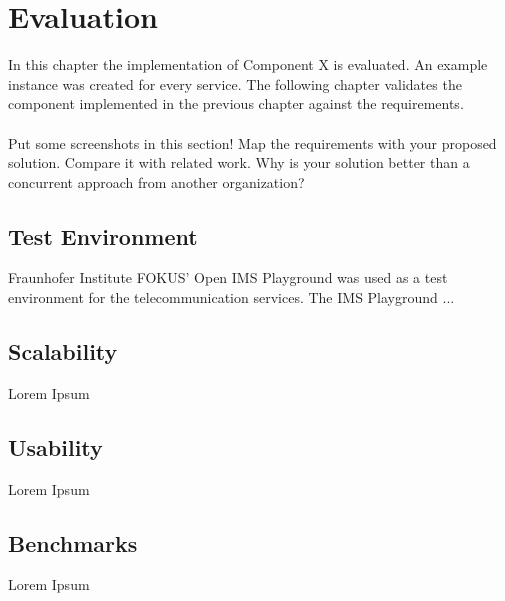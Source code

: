 \chapter{Evaluation\label{cha:chapter6}}

In this chapter the implementation of Component X is evaluated. An example instance was created for every service. The following chapter validates the component implemented in the previous chapter against the requirements.
\\
\\
Put some screenshots in this section! Map the requirements with your proposed solution. Compare it with related work. Why is your solution better than a concurrent approach from another organization?

\section{Test Environment\label{sec:testenvir}}

Fraunhofer Institute FOKUS' Open IMS Playground was used as a test environment for the telecommunication services. The IMS Playground ...

\section{Scalability\label{sec:scal}}

Lorem Ipsum

\section{Usability\label{sec:usab}}

Lorem Ipsum

\section{Benchmarks\label{sec:benchmarks}}

Lorem Ipsum